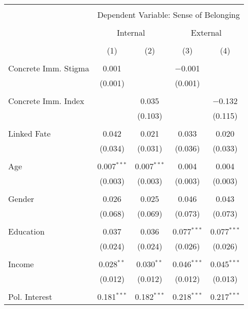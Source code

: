 
\begin{table}[!htbp] \centering 
  \caption{} 
  \label{} 
\begin{tabular}{@{\extracolsep{5pt}}lcccc} 
\\[-1.8ex]\hline 
\hline \\[-1.8ex] 
 & \multicolumn{4}{c}{Dependent Variable: Sense of Belonging} \\ 
\cline{2-5} 
\\[-1.8ex] & \multicolumn{2}{c}{Internal} & \multicolumn{2}{c}{External} \\ 
\\[-1.8ex] & (1) & (2) & (3) & (4)\\ 
\hline \\[-1.8ex] 
 Concrete Imm. Stigma & 0.001 &  & $-$0.001 &  \\ 
  & (0.001) &  & (0.001) &  \\ 
  & & & & \\ 
 Concrete Imm. Index &  & 0.035 &  & $-$0.132 \\ 
  &  & (0.103) &  & (0.115) \\ 
  & & & & \\ 
 Linked Fate & 0.042 & 0.021 & 0.033 & 0.020 \\ 
  & (0.034) & (0.031) & (0.036) & (0.033) \\ 
  & & & & \\ 
 Age & 0.007$^{***}$ & 0.007$^{***}$ & 0.004 & 0.004 \\ 
  & (0.003) & (0.003) & (0.003) & (0.003) \\ 
  & & & & \\ 
 Gender & 0.026 & 0.025 & 0.046 & 0.043 \\ 
  & (0.068) & (0.069) & (0.073) & (0.073) \\ 
  & & & & \\ 
 Education & 0.037 & 0.036 & 0.077$^{***}$ & 0.077$^{***}$ \\ 
  & (0.024) & (0.024) & (0.026) & (0.026) \\ 
  & & & & \\ 
 Income & 0.028$^{**}$ & 0.030$^{**}$ & 0.046$^{***}$ & 0.045$^{***}$ \\ 
  & (0.012) & (0.012) & (0.012) & (0.013) \\ 
  & & & & \\ 
 Pol. Interest & 0.181$^{***}$ & 0.182$^{***}$ & 0.218$^{***}$ & 0.217$^{***}$ \\ 

\end{tabular}
\end{table}
